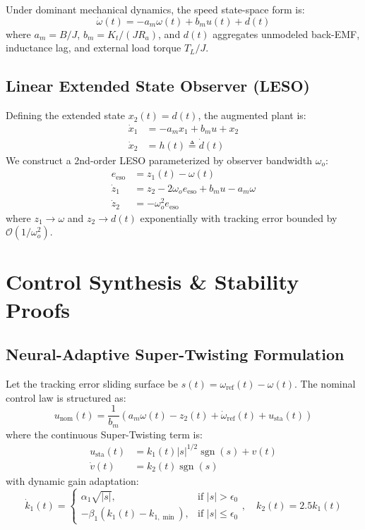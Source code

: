 \documentclass[journal,twocolumn,letterpaper]{IEEEtran}
\begin{document}
Under dominant mechanical dynamics, the speed state-space form is:
\begin{equation}
\dot{\omega}(t) = -a_m \omega(t) + b_m u(t) + d(t)
\end{equation}
where $a_m = B/J$, $b_m = K_t / (J R_a)$, and $d(t)$ aggregates unmodeled back-EMF, inductance lag, and external load torque $T_L/J$.

\subsection{Linear Extended State Observer (LESO)}
Defining the extended state $x_2(t) = d(t)$, the augmented plant is:
\begin{align}
\dot{x}_1 &= -a_m x_1 + b_m u + x_2 \\
\dot{x}_2 &= h(t) \triangleq \dot{d}(t)
\end{align}
We construct a 2nd-order LESO parameterized by observer bandwidth $\omega_o$:
\begin{align}
e_{\text{eso}} &= z_1(t) - \omega(t) \\
\dot{z}_1 &= z_2 - 2\omega_o e_{\text{eso}} + b_m u - a_m \omega \\
\dot{z}_2 &= -\omega_o^2 e_{\text{eso}}
\end{align}
where $z_1 \to \omega$ and $z_2 \to d(t)$ exponentially with tracking error bounded by $\mathcal{O}(1/\omega_o^2)$.

\section{Control Synthesis \& Stability Proofs}

\subsection{Neural-Adaptive Super-Twisting Formulation}
Let the tracking error sliding surface be $s(t) = \omega_{\text{ref}}(t) - \omega(t)$. The nominal control law is structured as:
\begin{equation}
u_{\text{nom}}(t) = \frac{1}{b_m} \left( a_m \omega(t) - z_2(t) + \dot{\omega}_{\text{ref}}(t) + u_{\text{sta}}(t) \right)
\end{equation}
where the continuous Super-Twisting term is:
\begin{align}
u_{\text{sta}}(t) &= k_1(t) |s|^{1/2} \operatorname{sgn}(s) + v(t) \\
\dot{v}(t) &= k_2(t) \operatorname{sgn}(s)
\end{align}
with dynamic gain adaptation:
\begin{equation}
\dot{k}_1(t) = \begin{cases} \alpha_1 \sqrt{|s|}, & \text{if } |s| > \epsilon_0 \\ -\beta_1 (k_1(t) - k_{1,\min}), & \text{if } |s| \le \epsilon_0 \end{cases}, \quad k_2(t) = 2.5 k_1(t)
\end{equation}
\end{document}
